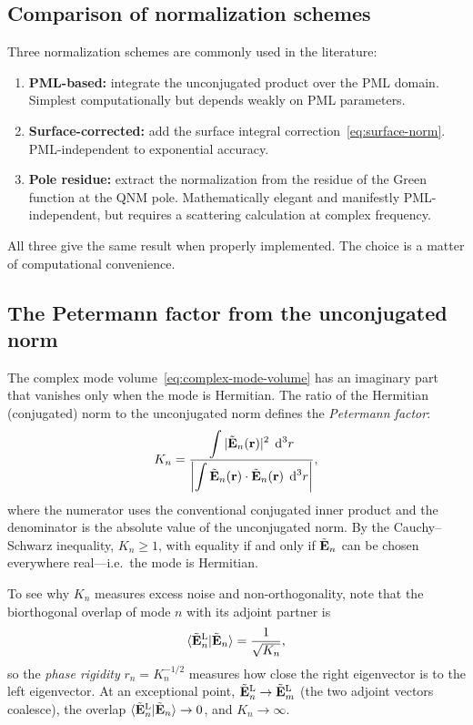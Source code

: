 \subsection{Comparison of normalization schemes}
\label{ssec:norm-comparison}

Three normalization schemes are commonly used in the literature:
\begin{enumerate}
 \item \textbf{PML-based:} integrate the unconjugated product over
 the PML domain. Simplest computationally but depends weakly on
 PML parameters.
 \item \textbf{Surface-corrected:} add the surface integral
 correction~\eqref{eq:surface-norm}. PML-independent to
 exponential accuracy.
 \item \textbf{Pole residue:} extract the normalization from the
 residue of the Green function at the QNM pole. Mathematically
 elegant and manifestly PML-independent, but requires a scattering
 calculation at complex frequency.
\end{enumerate}
All three give the same result when properly implemented. The choice is
a matter of computational convenience.

\subsection{The Petermann factor from the unconjugated norm}
\label{ssec:petermann-from-norm}

The complex mode volume~\eqref{eq:complex-mode-volume} has an imaginary
part that vanishes only when the mode is Hermitian. The ratio of the
Hermitian (conjugated) norm to the unconjugated norm defines the
\emph{Petermann factor}:
\begin{equation}
 K_n = \frac{\displaystyle\int |\tilde{\mathbf{E}}_n(\mathbf{r})|^2\;\mathop{}\!\mathrm{d}^3 r}
 {\displaystyle\left|\int
 \tilde{\mathbf{E}}_n(\mathbf{r})\cdot\tilde{\mathbf{E}}_n(\mathbf{r})\;\mathop{}\!\mathrm{d}^3 r
 \right|},
 \label{eq:petermann-definition}
\end{equation}
where the numerator uses the conventional conjugated inner product and
the denominator is the absolute value of the unconjugated norm. By the
Cauchy--Schwarz inequality, $K_n \ge 1$, with equality if and only if
$\tilde{\mathbf{E}}_n$ can be chosen everywhere real---i.e.\ the mode is
Hermitian.

To see why $K_n$ measures excess noise and non-orthogonality, note that
the biorthogonal overlap of mode $n$ with its adjoint partner is
\begin{equation}
 \langle \tilde{\mathbf{E}}_n^{\mathrm{L}} | \tilde{\mathbf{E}}_n \rangle
 = \frac{1}{\sqrt{K_n}},
 \label{eq:petermann-phase-rigidity}
\end{equation}
so the \emph{phase rigidity} $r_n = K_n^{-1/2}$ measures how close
the right eigenvector is to the left eigenvector. At an exceptional
point, $\tilde{\mathbf{E}}_n^{\mathrm{L}} \to \tilde{\mathbf{E}}_m^{\mathrm{L}}$
(the two adjoint vectors coalesce), the overlap
$\langle \tilde{\mathbf{E}}_n^{\mathrm{L}} | \tilde{\mathbf{E}}_n \rangle \to 0$,
and $K_n \to \infty$.


